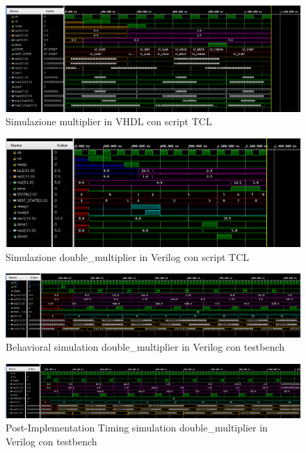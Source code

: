 \documentclass[]{IEEEtran}
\begin{document}
\begin{figure}[bt]
    \centering
    \includegraphics[width=\textwidth]{figures/sim_mult_vhdl}
    \caption{Simulazione multiplier in VHDL con script TCL}
    \label{fig:SIM_MULT_VHDL}
\end{figure}

\begin{figure}[bt]
    \centering
    \includegraphics[width=\textwidth]{figures/sim_dm}
    \caption{Simulazione double\_multiplier in Verilog con script TCL}
    \label{fig:SIM_DM}
\end{figure}

\begin{figure}[bt]
    \centering
    \includegraphics[width=\textwidth]{figures/sim_tb_bh}
    \caption{Behavioral simulation double\_multiplier in Verilog con testbench}
    \label{fig:SIM_TB_BH}
\end{figure}

\begin{figure}[bt]
    \centering
    \includegraphics[width=\textwidth]{figures/sim_tb_tim}
    \caption{Post-Implementation Timing simulation double\_multiplier in Verilog con testbench}
    \label{fig:SIM_TB_TIM}
\end{figure}
\end{document}
